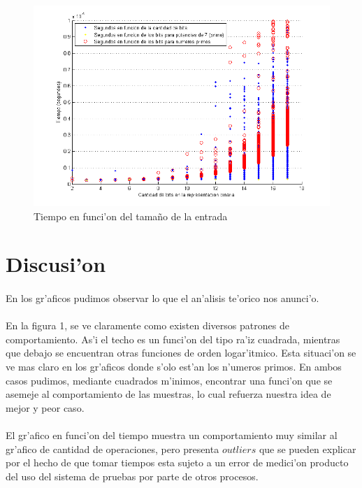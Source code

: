 \begin{figure}[H]
\centering
\includegraphics[scale=0.65]{../../codigo/ejercicio1/benchmark_de_tiempo/graficos/tamanio_Entrada_T/Tiempo_en_funcion_bits.png}
\caption{Tiempo en funci'on del tama\~{n}o de la entrada}
\label{Ej1fig6}
\end{figure}
\newpage
\section{Discusi'on}
\paragraph{}
En los gr'aficos pudimos observar lo que el an'alisis te'orico nos anunci'o.
\paragraph{}
En la figura 1, se ve claramente como existen diversos patrones de comportamiento. As'i el techo es un funci'on del tipo ra'iz 
cuadrada, mientras que debajo se encuentran otras funciones de orden logar'itmico. Esta situaci'on se ve mas claro en los 
gr'aficos donde s'olo est'an los n'umeros primos. En ambos casos pudimos, mediante cuadrados m'inimos, 
encontrar una funci'on que se asemeje al comportamiento de las muestras, lo cual refuerza nuestra idea de mejor y peor caso.
\paragraph{}
El gr'afico en funci'on del tiempo muestra un comportamiento muy similar al gr'afico de cantidad de operaciones, pero presenta 
$outliers$ que se pueden explicar por el hecho de que tomar tiempos esta sujeto a un error de medici'on producto del uso del sistema
de pruebas por parte de otros procesos.
